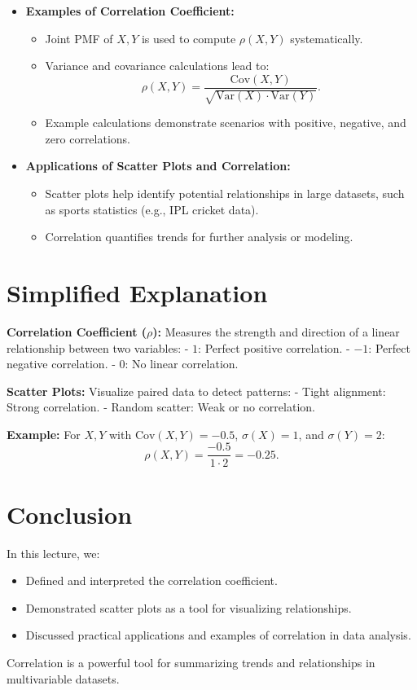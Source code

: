 \documentclass{article}
\begin{document}
\begin{itemize}
  \item \textbf{Examples of Correlation Coefficient:}
    \begin{itemize}
      \item Joint PMF of $X, Y$ is used to compute $\rho(X, Y)$ systematically.
      \item Variance and covariance calculations lead to:
        \[
          \rho(X, Y) = \frac{\text{Cov}(X, Y)}{\sqrt{\text{Var}(X) \cdot \text{Var}(Y)}}.
        \]
      \item Example calculations demonstrate scenarios with positive, negative, and zero correlations.
    \end{itemize}

  \item \textbf{Applications of Scatter Plots and Correlation:}
    \begin{itemize}
      \item Scatter plots help identify potential relationships in large datasets, such as sports statistics (e.g., IPL cricket data).
      \item Correlation quantifies trends for further analysis or modeling.
    \end{itemize}
\end{itemize}

\section*{Simplified Explanation}

\textbf{Correlation Coefficient ($\rho$):}
Measures the strength and direction of a linear relationship between two variables:
- $1$: Perfect positive correlation.
- $-1$: Perfect negative correlation.
- $0$: No linear correlation.

\textbf{Scatter Plots:}
Visualize paired data to detect patterns:
- Tight alignment: Strong correlation.
- Random scatter: Weak or no correlation.

\textbf{Example:}
For $X, Y$ with $\text{Cov}(X, Y) = -0.5$, $\sigma(X) = 1$, and $\sigma(Y) = 2$:
\[
  \rho(X, Y) = \frac{-0.5}{1 \cdot 2} = -0.25.
\]

\section*{Conclusion}

In this lecture, we:
\begin{itemize}
  \item Defined and interpreted the correlation coefficient.
  \item Demonstrated scatter plots as a tool for visualizing relationships.
  \item Discussed practical applications and examples of correlation in data analysis.
\end{itemize}

Correlation is a powerful tool for summarizing trends and relationships in multivariable datasets.
\end{document}
